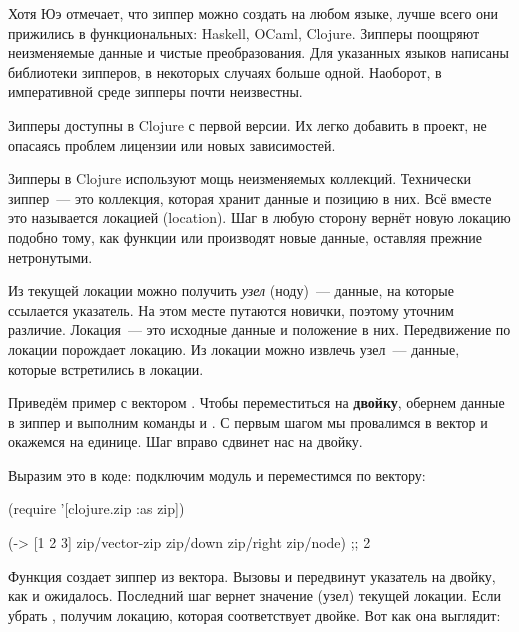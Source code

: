 
Хотя Юэ отмечает, что зиппер можно создать на любом языке, лучше всего они
прижились в функциональных: Haskell, OCaml, Clojure. Зипперы поощряют
неизменяемые данные и чистые преобразования. Для указанных языков написаны
библиотеки зипперов, в некоторых случаях больше одной. Наоборот, в императивной
среде зипперы почти неизвестны.

Зипперы доступны в Clojure с первой версии. Их легко добавить в проект, не
опасаясь проблем лицензии или новых зависимостей.

Зипперы в Clojure используют мощь неизменяемых коллекций. Технически зиппер~---
это коллекция, которая хранит данные и позицию в них. Всё вместе это называется
локацией (location). Шаг в любую сторону вернёт новую локацию подобно тому, как
функции  или  производят новые данные, оставляя прежние
нетронутыми.


Из текущей локации можно получить \emph{узел} (ноду)~--- данные, на которые ссылается
указатель. На этом месте путаются новички, поэтому уточним различие. Локация~---
это исходные данные и положение в них. Передвижение по локации порождает
локацию. Из локации можно извлечь узел~--- данные, которые встретились в локации.


Приведём пример с вектором \code{[1 2 3]}. Чтобы переместиться на
\textbf{двойку}, обернем данные в зиппер и выполним команды  и
. С первым шагом мы провалимся в вектор и окажемся на
единице. Шаг вправо сдвинет нас на двойку.

Выразим это в коде: подключим модуль  и переместимся по
вектору:

\begin{english}
  \begin{clojure}
(require '[clojure.zip :as zip])

(-> [1 2 3]
    zip/vector-zip
    zip/down
    zip/right
    zip/node)
;; 2
  \end{clojure}
\end{english}

Функция  создает зиппер из вектора. Вызовы  и
 передвинут указатель на двойку, как и ожидалось. Последний шаг
 вернет значение (узел) текущей локации. Если убрать ,
получим локацию, которая соответствует двойке. Вот как она выглядит:

